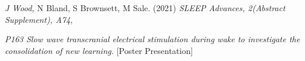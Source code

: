 \item
	\textit{J Wood, }N Bland, S Brownsett, M Sale. (2021) \textit{SLEEP Advances, 2(Abstract Supplement), A74,} \par
	\textit{P163 Slow wave transcranial electrical stimulation during wake to investigate the consolidation of new learning.} [Poster Presentation] 

